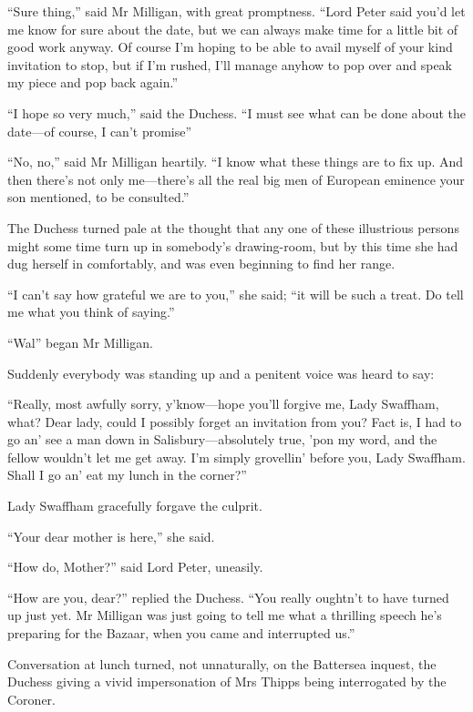 \enquote{Sure thing,} said Mr Milligan, with great promptness. \enquote{Lord Peter said you’d let me know for sure about the date, but we can always make time for a little bit of good work anyway. Of course I’m hoping to be able to avail myself of your kind invitation to stop, but if I’m rushed, I’ll manage anyhow to pop over and speak my piece and pop back again.}

\enquote{I hope so very much,} said the Duchess. \enquote{I must see what can be done about the date\allowbreak---\allowbreak of course, I can’t promise\longdash}

\enquote{No, no,} said Mr Milligan heartily. \enquote{I know what these things are to fix up. And then there’s not only me\allowbreak---\allowbreak there’s all the real big men of European eminence your son mentioned, to be consulted.}

The Duchess turned pale at the thought that any one of these illustrious persons might some time turn up in somebody’s drawing-room, but by this time she had dug herself in comfortably, and was even beginning to find her range.

\enquote{I can’t say how grateful we are to you,} she said; \enquote{it will be such a treat. Do tell me what you think of saying.}

\enquote{Wal\longdash} began Mr Milligan.

Suddenly everybody was standing up and a penitent voice was heard to say:

\enquote{Really, most awfully sorry, y’know\allowbreak---\allowbreak hope you’ll forgive me, Lady Swaffham, what? Dear lady, could I possibly forget an invitation from you? Fact is, I had to go an’ see a man down in Salisbury\allowbreak---\allowbreak absolutely true, ’pon my word, and the fellow wouldn’t let me get away. I’m simply grovellin’ before you, Lady Swaffham. Shall I go an’ eat my lunch in the corner?}

Lady Swaffham gracefully forgave the culprit.

\enquote{Your dear mother is here,} she said.

\enquote{How do, Mother?} said Lord Peter, uneasily.

\enquote{How are you, dear?} replied the Duchess. \enquote{You really oughtn’t to have turned up just yet. Mr Milligan was just going to tell me what a thrilling speech he’s preparing for the Bazaar, when you came and interrupted us.}

Conversation at lunch turned, not unnaturally, on the Battersea inquest, the Duchess giving a vivid impersonation of Mrs Thipps being interrogated by the Coroner.

